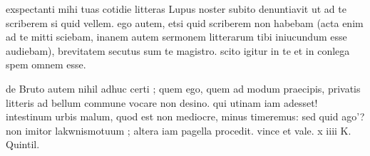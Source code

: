 


 exspectanti mihi tuas cotidie litteras Lupus noster subito denuntiavit ut ad te scriberem si quid vellem. ego autem, etsi quid scriberem non habebam (acta enim ad te mitti sciebam, inanem autem sermonem litterarum tibi iniucundum esse audiebam), brevitatem secutus sum te magistro. scito igitur in te et in conlega spem omnem esse.

 de Bruto autem nihil adhuc certi ; quem ego, quem ad modum praecipis, privatis litteris ad bellum commune vocare non desino. qui utinam iam adesset! intestinum urbis malum, quod est non mediocre, minus timeremus: sed quid ago'? non imitor lakwnismo\n tuum ; altera iam pagella procedit. vince et vale. x iiii K. Quintil.
